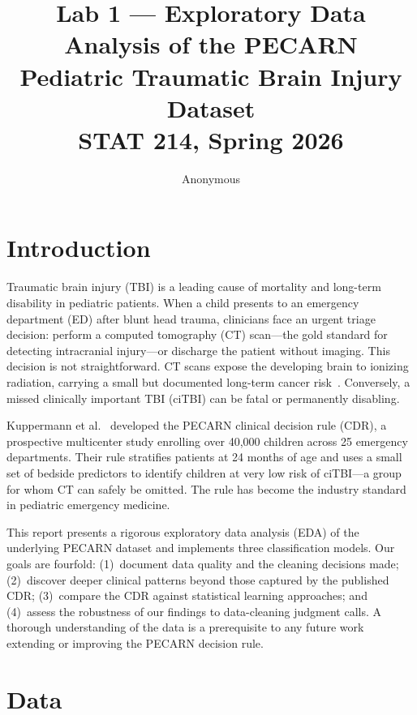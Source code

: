 \documentclass[10pt,letterpaper]{article}
\title{Lab 1 --- Exploratory Data Analysis of the PECARN\\
Pediatric Traumatic Brain Injury Dataset\\
\large STAT 214, Spring 2026}
\author{Anonymous}
\date{}
\begin{document}
\maketitle

\section{Introduction}
\label{introduction}

Traumatic brain injury (TBI) is a leading cause of mortality and long-term disability in pediatric
patients.
When a child presents to an emergency department (ED) after blunt head trauma, clinicians face
an urgent triage decision: perform a computed tomography (CT) scan---the gold standard for detecting
intracranial injury---or discharge the patient without imaging.
This decision is not straightforward.
CT scans expose the developing brain to ionizing radiation, carrying a small but documented
long-term cancer risk~\cite{kuppermann2009}.
Conversely, a missed clinically important TBI (ciTBI) can be fatal or permanently disabling.

Kuppermann et al.~\cite{kuppermann2009} developed the PECARN clinical decision rule (CDR), a
prospective multicenter study enrolling over 40,000 children across 25 emergency departments.
Their rule stratifies patients at 24 months of age and uses a small set of bedside predictors to
identify children at very low risk of ciTBI---a group for whom CT can safely be omitted.
The rule has become the industry standard in pediatric emergency medicine.

This report presents a rigorous exploratory data analysis (EDA) of the underlying PECARN dataset
and implements three classification models.
Our goals are fourfold:
(1)~document data quality and the cleaning decisions made;
(2)~discover deeper clinical patterns beyond those captured by the published CDR;
(3)~compare the CDR against statistical learning approaches; and
(4)~assess the robustness of our findings to data-cleaning judgment calls.
A thorough understanding of the data is a prerequisite to any future work extending or improving
the PECARN decision rule.

\section{Data}
\label{data}
\end{document}
